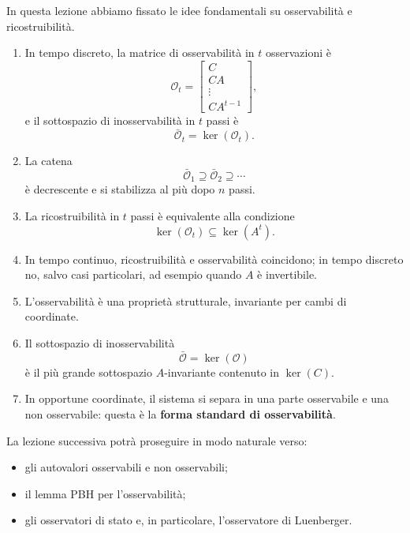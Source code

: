 In questa lezione abbiamo fissato le idee fondamentali su osservabilità e ricostruibilità.

\begin{enumerate}
    \item In tempo discreto, la matrice di osservabilità in \(t\) osservazioni è
    \[
    \mathcal O_t=
    \begin{bmatrix}
    C\\
    CA\\
    \vdots\\
    CA^{t-1}
    \end{bmatrix},
    \]
    e il sottospazio di inosservabilità in \(t\) passi è
    \[
    \bar{\mathcal O}_t=\ker(\mathcal O_t).
    \]

    \item La catena
    \[
    \bar{\mathcal O}_1 \supseteq \bar{\mathcal O}_2 \supseteq \cdots
    \]
    è decrescente e si stabilizza al più dopo \(n\) passi.

    \item La ricostruibilità in \(t\) passi è equivalente alla condizione
    \[
    \ker(\mathcal O_t)\subseteq \ker(A^t).
    \]

    \item In tempo continuo, ricostruibilità e osservabilità coincidono; in tempo discreto no, salvo casi particolari, ad esempio quando \(A\) è invertibile.

    \item L'osservabilità è una proprietà strutturale, invariante per cambi di coordinate.

    \item Il sottospazio di inosservabilità
    \[
    \bar{\mathcal O}=\ker(\mathcal O)
    \]
    è il più grande sottospazio \(A\)-invariante contenuto in \(\ker(C)\).

    \item In opportune coordinate, il sistema si separa in una parte osservabile e una non osservabile:
    questa è la \textbf{forma standard di osservabilità}.
\end{enumerate}

\bigskip

La lezione successiva potrà proseguire in modo naturale verso:
\begin{itemize}
    \item gli autovalori osservabili e non osservabili;
    \item il lemma PBH per l'osservabilità;
    \item gli osservatori di stato e, in particolare, l'osservatore di Luenberger.
\end{itemize}